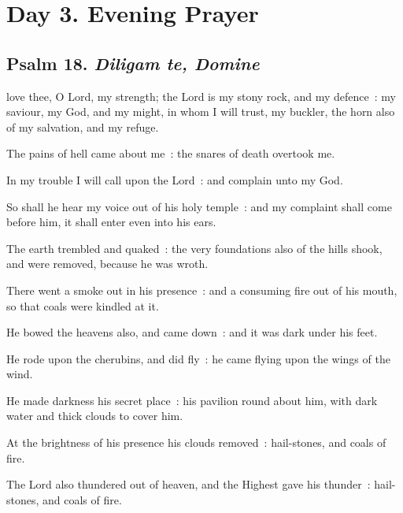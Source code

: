 \section*{Day 3. Evening Prayer}

\subsection{Psalm 18. \textit{Diligam te, Domine}}


 love thee, O Lord, my strength; the Lord is my stony rock, and my defence~: my saviour, my God, and my might, in whom I will trust, my buckler, the horn also of my salvation, and my refuge.\par
{}
The pains of hell came about me~: the snares of death overtook me.\par
{}In my trouble I will call upon the Lord~: and complain unto my God.\par
{}So shall he hear my voice out of his holy temple~: and my complaint shall come before him, it shall enter even into his ears.\par
{}The earth trembled and quaked~: the very foundations also of the hills shook, and were removed, because he was wroth.\par
{}There went a smoke out in his presence~: and a consuming fire out of his mouth, so that coals were kindled at it.\par
{}He bowed the heavens also, and came down~: and it was dark under his feet.\par
{}He rode upon the cherubins, and did fly~: he came flying upon the wings of the wind.\par
{}He made darkness his secret place~: his pavilion round about him, with dark water and thick clouds to cover him.\par
{}At the brightness of his presence his clouds removed~: hail-stones, and coals of fire.\par
{}The Lord also thundered out of heaven, and the Highest gave his thunder~: hail-stones, and coals of fire.\par
